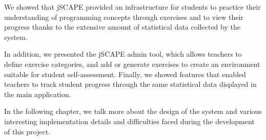 We showed that jSCAPE provided an infrastructure for students to practice their understanding of programming concepts through exercises and to view their progress thanks to the extensive amount of statistical data collected by the system.\newline

In addition, we presented the jSCAPE admin tool, which allows teachers to define exercise categories, and add or generate exercises to create an environment suitable for student self-assessment. Finally, we showed features that enabled teachers to track student progress through the same statistical data displayed in the main application. \newline

In the following chapter, we talk more about the design of the system and various interesting implementation details and difficulties faced during the development of this project.

